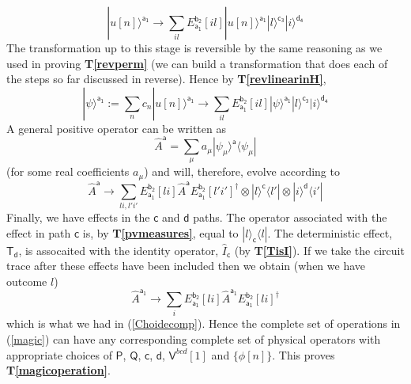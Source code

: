 \documentclass[10pt]{article}
\begin{document}
\begin{equation}
|u[n]\rangle^\mathsf{a_1} \rightarrow \sum_{il} E_\mathsf{a_1}^\mathsf{b_2}[il] |u[n]\rangle^\mathsf{a_1}|l\rangle^\mathsf{c_3}|i\rangle^\mathsf{d_4}
\end{equation}
The transformation up to this stage is reversible by the same reasoning as we used in proving {\bf T\ref{revperm}} (we can build a transformation that does each of the steps so far discussed in reverse).  Hence by {\bf T\ref{revlinearinH}},
\begin{equation}
|\psi\rangle^\mathsf{a_1} := \sum_n c_n |u[n]\rangle^\mathsf{a_1} \rightarrow
\sum_{il} E_\mathsf{a_1}^\mathsf{b_2}[il] |\psi\rangle^\mathsf{a_1}|l\rangle^\mathsf{c_3}|i\rangle^\mathsf{d_4}
\end{equation}
A general positive operator can be written as
\begin{equation}
\hat A^\mathsf{a} = \sum_\mu a_\mu |\psi_\mu\rangle^\mathsf{a}\langle\psi_\mu|
\end{equation}
(for some real coefficients $a_\mu$)
and will, therefore, evolve according to
\begin{equation}
\hat A^\mathsf{a} \rightarrow  \sum_{li,l'i'} E_\mathsf{a_1}^\mathsf{b_2}[li] \hat A^\mathsf{a} E_\mathsf{a_1}^\mathsf{b_2}[l'i']^\dagger \otimes
|l\rangle^\mathsf{c}\langle l'| \otimes |i\rangle^\mathsf{d} \langle i'|
\end{equation}
Finally, we have effects in the $\mathsf c$ and $\mathsf d$ paths.  The operator associated with the effect in path $\mathsf c$ is, by {\bf T\ref{pvmeasures}}, equal to $|l\rangle_\mathsf{c}\langle l|$.  The deterministic effect, $\mathsf{T_d}$, is assocaited with the identity operator, $\hat I_\mathsf{c}$ (by {\bf T\ref{TisI}}). If we take the circuit trace after these effects have been included then we obtain (when we have outcome $l$)
\begin{equation}
\hat A^\mathsf{a_1} \rightarrow \sum_i E_\mathsf{a_1}^\mathsf{b_2}[li] \hat A^\mathsf{a_1} E_\mathsf{a_1}^\mathsf{b_2}[li]^\dagger
\end{equation}
which is what we had in (\ref{Choidecomp}). Hence the complete set of operations in ({\ref{magic}}) can have any corresponding complete set of physical operators with appropriate choices of $\mathsf P$, $\mathsf Q$, $\mathsf c$, $\mathsf d$, ${\mathsf V^{bcd}}[1]$ and $\{\phi[n]\}$. This proves {\bf T\ref{magicoperation}}.
\end{document}
